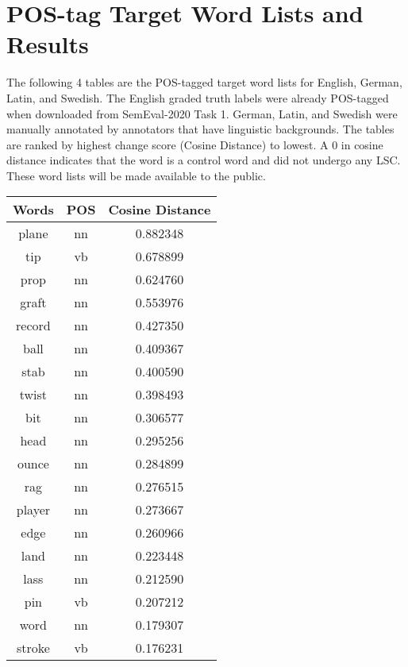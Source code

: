 \section{POS-tag Target Word Lists and Results}
\label{app-postags}


The following 4 tables are the POS-tagged target word lists for English, German, Latin, and Swedish. The English graded truth labels were already POS-tagged when downloaded from SemEval-2020 Task 1. German, Latin, and Swedish were manually annotated by annotators that have linguistic backgrounds. The tables are ranked by highest change score (Cosine Distance) to lowest. A 0 in cosine distance indicates that the word is a control word and did not undergo any LSC. These word lists will be made available to the public.

\begin{table}[h]
\centering
\begin{tabular}{ccc} 
\toprule
Words         & POS & Cosine Distance  \\ 
\midrule
plane         & nn  & 0.882348         \\
tip           & vb  & 0.678899         \\
prop          & nn  & 0.624760         \\
graft         & nn  & 0.553976         \\
record        & nn  & 0.427350         \\
ball          & nn  & 0.409367         \\
stab          & nn  & 0.400590         \\
twist         & nn  & 0.398493         \\
bit           & nn  & 0.306577         \\
head          & nn  & 0.295256         \\
ounce         & nn  & 0.284899         \\
rag           & nn  & 0.276515         \\
player        & nn  & 0.273667         \\
edge          & nn  & 0.260966         \\
land          & nn  & 0.223448         \\
lass          & nn  & 0.212590         \\
pin           & vb  & 0.207212         \\
word          & nn  & 0.179307         \\
stroke        & vb  & 0.176231         \\

\end{tabular}
\end{table}
